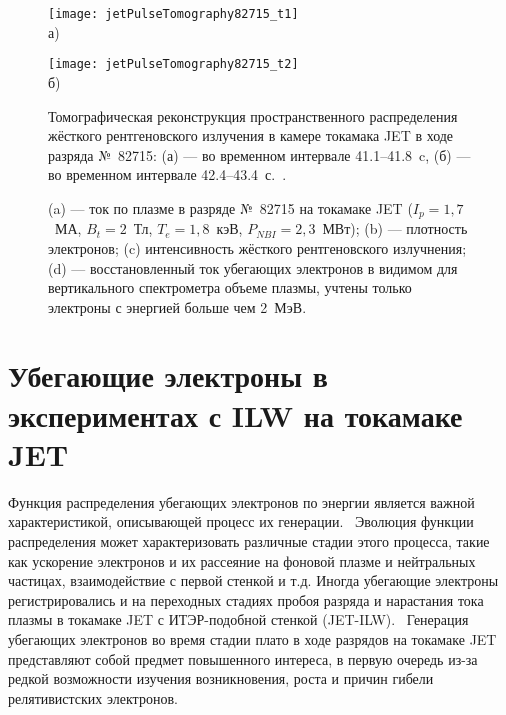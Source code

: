 \begin{figure}[ht]
    \begin{minipage}[b][][b]{0.48\linewidth}\centering
        \texttt{[image: jetPulseTomography82715\_t1]} \\ а)
    \end{minipage}
    \hfill
    \begin{minipage}[b][][b]{0.48\linewidth}\centering
        \texttt{[image: jetPulseTomography82715\_t2]} \\ б)
    \end{minipage}
    \caption{ Томографическая реконструкция пространственного распределения жёсткого рентгеновского излучения в камере токамака JET в ходе разряда №~82715: (а) --- во временном интервале 41.1--41.8~c, (б) --- во временном интервале 42.4--43.4~с.~\cite{Shevelev2013a}. }
    \label{fig:jetPulseTomography82715}
\end{figure}

\begin{figure}[ht!]
  \caption{ (a) --- ток по плазме в разряде №~82715 на токамаке JET ($I_p = 1,7$~МА, $B_t = 2$~Тл, $T_e = 1,8$~кэВ, $P_{NBI} = 2,3$~МВт); (b) ---  плотность электронов; (c) интенсивность жёсткого рентгеновского излучнения; (d) --- восстановленный ток убегающих электронов в видимом для вертикального спектрометра объеме плазмы, учтены только электроны с энергией больше чем 2~МэВ.~\cite{Shevelev2013} }
  \label{fig:jetPulseParams82715}
\end{figure}



\FloatBarrier
\section{Убегающие электроны в экспериментах с ILW на токамаке JET}

Функция распределения убегающих электронов по энергии является важной характеристикой, описывающей процесс их генерации.~\cite{Plyusnin2015} Эволюция функции распределения может характеризовать различные стадии этого процесса, такие как ускорение электронов и их рассеяние на фоновой плазме и нейтральных частицах, взаимодействие с первой стенкой и т.д. Иногда убегающие электроны регистрировались и на переходных стадиях пробоя разряда и нарастания тока плазмы в токамаке JET с ИТЭР-подобной стенкой (JET-ILW).~\cite{Plyusnin2015} Генерация убегающих электронов во время стадии плато в ходе разрядов на токамаке JET представляют собой предмет повышенного интереса, в первую очередь из-за редкой возможности изучения возникновения, роста и причин гибели релятивистских электронов.~\cite{Granetz2014} 

